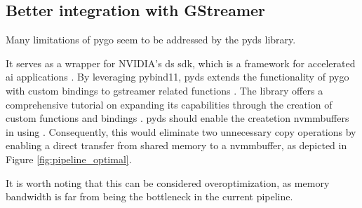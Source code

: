 \subsection{Better integration with GStreamer}
Many limitations of \gls{pygo} seem to be addressed by the \gls{pyds} library.

It serves as a wrapper for NVIDIA's \gls{ds} \gls{sdk}, which is a framework for accelerated \gls{ai} applications \cite{nvidiaDeepStreamSDK2016}.
By leveraging \gls{pybind11}, \gls{pyds} extends the functionality of \gls{pygo} with custom bindings to \gls{gstreamer} related functions \cite{nvidiaaiiotReleasesNVIDIAAIIOTDeepstream}.
The library offers a comprehensive tutorial on expanding its capabilities through the creation of custom functions and bindings \cite[\textit{bindings/BINDINGSGUIDE.md}]{nvidiaaiiotReleasesNVIDIAAIIOTDeepstream}.
\gls{pyds} should enable the createtion \glspl{nvmmbuffer} in \py using  \cite{nvidiaNvBufSurfaceCreateDeepstreamDeepstream2023}\cite{babukrCreatingGstBuffersUsing2021}.
Consequently, this would eliminate two unnecessary copy operations by enabling a direct transfer from shared memory to a \gls{nvmmbuffer}, as depicted in Figure \ref{fig:pipeline_optimal}.

It is worth noting that this can be considered overoptimization, as memory bandwidth is far from being the bottleneck in the current pipeline.
